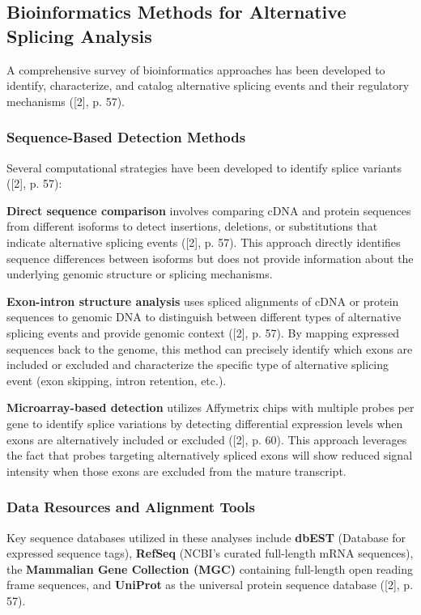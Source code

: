 \documentclass[12pt,a4paper]{article}
\begin{document}
\subsection{Bioinformatics Methods for Alternative Splicing Analysis}

A comprehensive survey of bioinformatics approaches has been developed to identify, characterize, and catalog alternative splicing events and their regulatory mechanisms ([2], p. 57).

\subsubsection{Sequence-Based Detection Methods}

Several computational strategies have been developed to identify splice variants ([2], p. 57):

\textbf{Direct sequence comparison} involves comparing cDNA and protein sequences from different isoforms to detect insertions, deletions, or substitutions that indicate alternative splicing events ([2], p. 57). This approach directly identifies sequence differences between isoforms but does not provide information about the underlying genomic structure or splicing mechanisms.

\textbf{Exon-intron structure analysis} uses spliced alignments of cDNA or protein sequences to genomic DNA to distinguish between different types of alternative splicing events and provide genomic context ([2], p. 57). By mapping expressed sequences back to the genome, this method can precisely identify which exons are included or excluded and characterize the specific type of alternative splicing event (exon skipping, intron retention, etc.).

\textbf{Microarray-based detection} utilizes Affymetrix chips with multiple probes per gene to identify splice variations by detecting differential expression levels when exons are alternatively included or excluded ([2], p. 60). This approach leverages the fact that probes targeting alternatively spliced exons will show reduced signal intensity when those exons are excluded from the mature transcript.

\subsubsection{Data Resources and Alignment Tools}

Key sequence databases utilized in these analyses include \textbf{dbEST} (Database for expressed sequence tags), \textbf{RefSeq} (NCBI's curated full-length mRNA sequences), the \textbf{Mammalian Gene Collection (MGC)} containing full-length open reading frame sequences, and \textbf{UniProt} as the universal protein sequence database ([2], p. 57).
\end{document}
